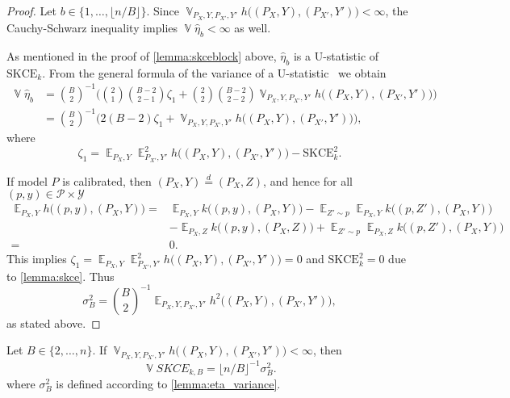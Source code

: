 \documentclass{article}
\DeclareMathOperator{\Exp}{\mathbb{E}}
\DeclareMathOperator{\Var}{\mathbb{V}}
\begin{document}
\begin{proof}
Let $b \in \{1, \ldots, \lfloor n / B \rfloor \}$. Since
$\Var_{P_X,Y,P_{X'},Y'} h\big((P_X, Y), (P_{X'}, Y')\big) < \infty$,
the Cauchy-Schwarz inequality implies $\Var \widehat{\eta}_b < \infty$
as well.

As mentioned in the proof of \cref{lemma:skceblock}
above, $\widehat{\eta}_b$ is a U-statistic of $\mathrm{SKCE}_k$.
From the general formula of the variance of a
U-statistic~\citep[see, e.g.,][p.~298--299]{Hoeffding1948}
we obtain
\begin{equation*}
    \begin{split}
        \Var \widehat{\eta}_b &= \binom{B}{2}^{-1} \bigg(\binom{2}{1} \binom{B-2}{2-1} \zeta_1
        + \binom{2}{2} \binom{B-2}{2-2} \Var_{P_X,Y,P_{X'},Y'} h\big((P_X, Y), (P_{X'}, Y')\big)\bigg) \\
        &= \binom{B}{2}^{-1} \Big(2(B-2) \zeta_1 + \Var_{P_X,Y,P_{X'},Y'} h\big((P_X, Y), (P_{X'}, Y')\big)\Big),
    \end{split}
\end{equation*}
where
\begin{equation*}
    \zeta_1 = \Exp_{P_X,Y} \Exp^2_{P_{X'},Y'} h\big((P_X, Y), (P_{X'}, Y')\big) - \mathrm{SKCE}^2_k.
\end{equation*}

If model $P$ is calibrated, then $(P_X, Y) \stackrel{d}{=} (P_X, Z)$,
and hence for all $(p, y) \in \mathcal{P} \times \mathcal{Y}$
\begin{equation*}
    \begin{split}
        \Exp_{P_X,Y} h\big((p, y), (P_X, Y)\big) ={}& \Exp_{P_X,Y} k\big((p, y), (P_X, Y)\big) - \Exp_{Z' \sim p} \Exp_{P_X,Y} k\big((p, Z'), (P_X, Y)\big) \\
        &- \Exp_{P_X,Z} k\big((p, y), (P_X, Z)\big) + \Exp_{Z' \sim p} \Exp_{P_X,Z} k\big((p, Z'), (P_X, Y)\big) \\
        ={}& 0.
    \end{split}
\end{equation*}
This implies $\zeta_1 = \Exp_{P_X,Y} \Exp^2_{P_{X'},Y'} h\big((P_X, Y), (P_{X'},Y')\big) = 0$
and $\mathrm{SKCE}^2_k = 0$ due to \cref{lemma:skce}. Thus
\begin{equation*}
    \sigma^2_B = \binom{B}{2}^{-1} \Exp_{P_X,Y,P_{X'},Y'} h^2\big((P_X, Y), (P_{X'}, Y')\big),
\end{equation*}
as stated above.
\end{proof}

\begin{corollary}\label{corr:skceblock_variance}
    Let $B \in \{2, \ldots, n\}$.
    If $\Var_{P_X,Y,P_{X'},Y'} h\big((P_X, Y), (P_{X'}, Y')\big) < \infty$,
    then
    \begin{equation*}
        \Var \widehat{SKCE}_{k,B} = \lfloor n / B \rfloor^{-1} \sigma^2_B.
    \end{equation*}
    where $\sigma^2_B$ is defined according to \cref{lemma:eta_variance}.
\end{corollary}
\end{document}
